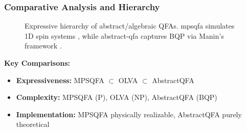 \subsubsection*{Comparative Analysis and Hierarchy}
\begin{figure}[h]
\centering
{}
\caption{Expressive hierarchy of abstract/algebraic QFAs. \gls{mpsqfa} simulates 1D spin systems \cite{vidal2003efficient}, while \gls{abstract-qfa} captures BQP via Manin's framework \cite{manin1980computable}.}
\label{fig:abstract-hierarchy}
\end{figure}

\textbf{Key Comparisons:}
\begin{itemize}
    \item \textbf{Expressiveness:} MPSQFA $\subset$ OLVA $\subset$ AbstractQFA
    \item \textbf{Complexity:} MPSQFA (P), OLVA (NP), AbstractQFA (BQP)
    \item \textbf{Implementation:} MPSQFA physically realizable, AbstractQFA purely theoretical
\end{itemize}